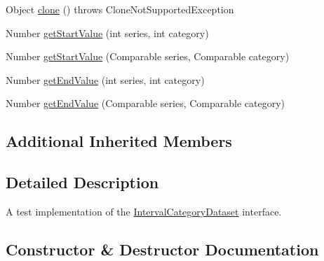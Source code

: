 \begin{DoxyCompactItemize}
\item 
Object \mbox{\hyperlink{classorg_1_1jfree_1_1data_1_1general_1_1_test_interval_category_dataset_a99def06f4532eefa100b3e9655d5cb54}{clone}} ()  throws Clone\+Not\+Supported\+Exception 
\item 
Number \mbox{\hyperlink{classorg_1_1jfree_1_1data_1_1general_1_1_test_interval_category_dataset_a53688ff9ac8176c9262fffe32280f470}{get\+Start\+Value}} (int series, int category)
\item 
Number \mbox{\hyperlink{classorg_1_1jfree_1_1data_1_1general_1_1_test_interval_category_dataset_ae3ea72c7a63af5350adc3eb94ac6d006}{get\+Start\+Value}} (Comparable series, Comparable category)
\item 
Number \mbox{\hyperlink{classorg_1_1jfree_1_1data_1_1general_1_1_test_interval_category_dataset_afa3067d374cf2eb3258450ead75d2cb8}{get\+End\+Value}} (int series, int category)
\item 
Number \mbox{\hyperlink{classorg_1_1jfree_1_1data_1_1general_1_1_test_interval_category_dataset_a595f5ee7d09a4215b9e0b006161894c9}{get\+End\+Value}} (Comparable series, Comparable category)
\end{DoxyCompactItemize}
\subsection*{Additional Inherited Members}


\subsection{Detailed Description}
A test implementation of the \mbox{\hyperlink{}{Interval\+Category\+Dataset}} interface. 

\subsection{Constructor \& Destructor Documentation}
\mbox{\label{classorg_1_1jfree_1_1data_1_1general_1_1_test_interval_category_dataset_a0722481e085676723d319bec534cd40d}} 
